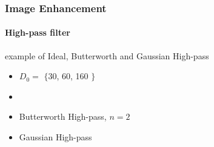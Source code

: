 \documentclass{beamer}
\begin{document}
\begin{frame}
\frametitle{Image Enhancement}
\framesubtitle{High-pass filter}
\begin{block}{example of Ideal, Butterworth and Gaussian High-pass}

\begin{itemize}
	\item[] \scriptsize{$D_{0} =$ $\{$30, 60, 160 $\}$}
	\item[]  \\
	\item[] \scriptsize{Butterworth High-pass, $n =2$} \\
	\item[] \scriptsize{Gaussian High-pass} \\
\end{itemize}
\end{block}
\end{frame}
\end{document}
